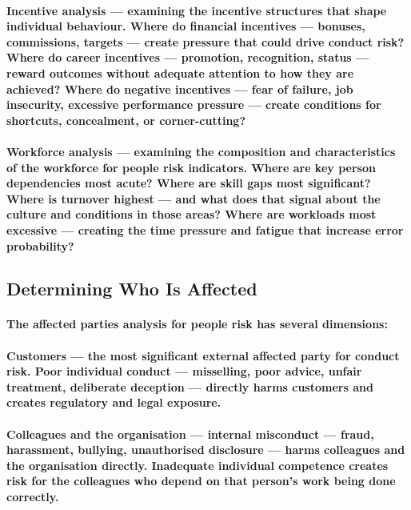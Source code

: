 \paragraph{\textbf{Incentive analysis} — examining the incentive structures that shape individual behaviour. Where do financial incentives — bonuses, commissions, targets — create pressure that could drive conduct risk? Where do career incentives — promotion, recognition, status — reward outcomes without adequate attention to how they are achieved? Where do negative incentives — fear of failure, job insecurity, excessive performance pressure — create conditions for shortcuts, concealment, or corner-cutting?}
\paragraph{\textbf{Workforce analysis} — examining the composition and characteristics of the workforce for people risk indicators. Where are key person dependencies most acute? Where are skill gaps most significant? Where is turnover highest — and what does that signal about the culture and conditions in those areas? Where are workloads most excessive — creating the time pressure and fatigue that increase error probability?}

\subsection{Determining Who Is Affected}
\paragraph{The affected parties analysis for people risk has several dimensions:}
\paragraph{\textbf{Customers} — the most significant external affected party for conduct risk. Poor individual conduct — misselling, poor advice, unfair treatment, deliberate deception — directly harms customers and creates regulatory and legal exposure.}
\paragraph{\textbf{Colleagues and the organisation} — internal misconduct — fraud, harassment, bullying, unauthorised disclosure — harms colleagues and the organisation directly. Inadequate individual competence creates risk for the colleagues who depend on that person's work being done correctly.}
